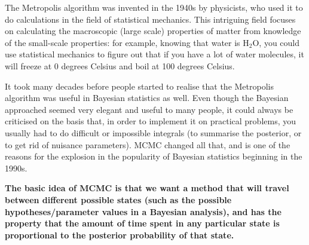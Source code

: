 The Metropolis algorithm was invented in the 1940s by physicists, who used it
to do calculations in the field of statistical mechanics. This intriguing field
focuses on calculating the macroscopic (large scale) properties of matter from
knowledge of the small-scale properties: for example, knowing that water is
H$_2$O, you could use statistical mechanics to figure out that if you have a lot
of water molecules, it will freeze at 0 degrees Celsius and boil at 100 degrees
Celsius.

It took
many decades before people started to realise that the Metropolis algorithm was useful in Bayesian
statistics as well. Even though the Bayesian approached seemed very elegant and
useful to many people, it could always be criticised on the basis that, in order
to implement it on practical problems, you usually had to do difficult or
impossible integrals (to summarise the posterior, or to get rid of nuisance
parameters). MCMC changed all that, and is one of the reasons for the
explosion in the popularity of Bayesian statistics beginning in the 1990s.

\begin{framed}
{\bf
The basic idea of MCMC is that we want a method that will travel between
different possible states (such as the possible hypotheses/parameter values in
a Bayesian analysis), and has the property that the amount of time spent in
any particular state is proportional to the posterior probability of that state.}
\end{framed}

